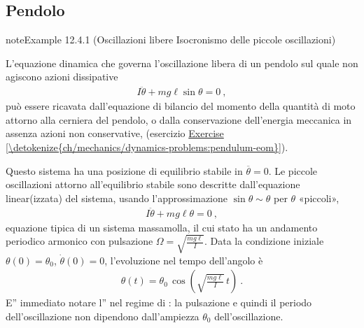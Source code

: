 \documentclass[letterpaper,10pt,italian]{jupyterBook}
\begin{document}
\subsection{Pendolo}
\label{\detokenize{ch/mechanics/dynamics-examples:pendolo}}\label{\detokenize{ch/mechanics/dynamics-examples:physics-hs-mechanics-dynamics-examples-pendulum}}\label{ch/mechanics/dynamics-examples:pendulum-free}
\begin{sphinxadmonition}{note}{Example 12.4.1 (Oscillazioni libere \sphinxhyphen{} Isocronismo delle piccole oscillazioni)}



\sphinxAtStartPar
L’equazione dinamica che governa l’oscillazione libera di un pendolo sul quale non agiscono azioni dissipative
\begin{equation*}
\begin{split}I \ddot{\theta} + m g \ell \sin \theta = 0 \ ,\end{split}
\end{equation*}
\sphinxAtStartPar
può essere ricavata dall’equazione di bilancio del momento della quantità di moto attorno alla cerniera del pendolo, o dalla conservazione dell’energia meccanica in assenza azioni non conservative, (esercizio \hyperref[\detokenize{ch/mechanics/dynamics-problems:pendulum-eom}]{Exercise \ref{\detokenize{ch/mechanics/dynamics-problems:pendulum-eom}}}).

\sphinxAtStartPar
Questo sistema ha una posizione di equilibrio stabile in \(\overline{\theta} = 0\).
Le piccole oscillazioni attorno all’equilibrio stabile sono descritte dall’equazione linear(izzata) del sistema, usando l’approssimazione \(\sin \theta \sim \theta\) per \(\theta\) «piccoli»,
\begin{equation*}
\begin{split}I \ddot{\theta} + m g \ell \theta = 0 \ ,\end{split}
\end{equation*}
\sphinxAtStartPar
equazione tipica di un sistema massa\sphinxhyphen{}molla, il cui stato ha un andamento periodico armonico con pulsazione \(\Omega = \sqrt{\frac{m g \ell}{I}}\). Data la condizione iniziale \(\theta(0) = \theta_0\), \(\dot{\theta}(0) = 0\), l’evoluzione nel tempo dell’angolo è
\begin{equation*}
\begin{split}\theta(t) = \theta_0 \, \cos \left( \sqrt{\frac{m g \ell}{I}} \, t \right) \ .\end{split}
\end{equation*}
\sphinxAtStartPar
E” immediato notare l” nel regime di : la pulsazione e quindi il periodo dell’oscillazione non dipendono dall’ampiezza \(\theta_0\) dell’oscillazione.
\end{sphinxadmonition}
\end{document}
